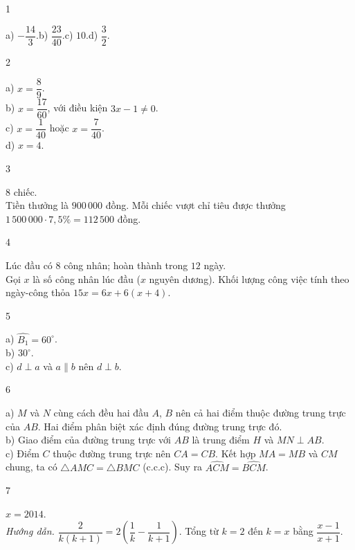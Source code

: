 \begin{Solbook}{1}
 \par \noindent  a) $-\dfrac {14}{3}$.\quad b) $\dfrac {23}{40}$.\quad c) $10$.\quad d) $\dfrac {3}{2}$.  \hfill \qedEX 
\end{Solbook}
\begin{Solbook}{2}
 \par \noindent  a) $x=\dfrac {8}{9}$.\\ b) $x=\dfrac {17}{60}$, với điều kiện $3x-1\neq 0$.\\ c) $x=\dfrac {1}{40}$ hoặc $x=\dfrac {7}{40}$.\\ d) $x=4$.  \hfill \qedEX 
\end{Solbook}
\begin{Solbook}{3}
 \par \noindent  $8$ chiếc.\\ Tiền thưởng là $900\,000$ đồng. Mỗi chiếc vượt chỉ tiêu được thưởng $1\,500\,000\cdot 7{,}5\%=112\,500$ đồng.  \hfill \qedEX 
\end{Solbook}
\begin{Solbook}{4}
 \par \noindent  Lúc đầu có $8$ công nhân; hoàn thành trong $12$ ngày.\\ Gọi $x$ là số công nhân lúc đầu ($x$ nguyên dương). Khối lượng công việc tính theo ngày-công thỏa $15x=6x+6(x+4)$.  \hfill \qedEX 
\end{Solbook}
\begin{Solbook}{5}
 \par \noindent  a) $\widehat {B_{1}}=60^{\circ }$.\\ b) $30^{\circ }$.\\ c) $d\perp a$ và $a\parallel b$ nên $d\perp b$.  \hfill \qedEX 
\end{Solbook}
\begin{Solbook}{6}
 \par \noindent  a) $M$ và $N$ cùng cách đều hai đầu $A$, $B$ nên cả hai điểm thuộc đường trung trực của $AB$. Hai điểm phân biệt xác định đúng đường trung trực đó.\\ b) Giao điểm của đường trung trực với $AB$ là trung điểm $H$ và $MN\perp AB$.\\ c) Điểm $C$ thuộc đường trung trực nên $CA=CB$. Kết hợp $MA=MB$ và $CM$ chung, ta có $\triangle AMC=\triangle BMC$ (c.c.c). Suy ra $\widehat {ACM}=\widehat {BCM}$.  \hfill \qedEX 
\end{Solbook}
\begin{Solbook}{7}
 \par \noindent  $x=2014$.\\ \textit {Hướng dẫn.} $\dfrac {2}{k(k+1)}=2\left (\dfrac {1}{k}-\dfrac {1}{k+1}\right )$. Tổng từ $k=2$ đến $k=x$ bằng $\dfrac {x-1}{x+1}$.  \hfill \qedEX 
\end{Solbook}

